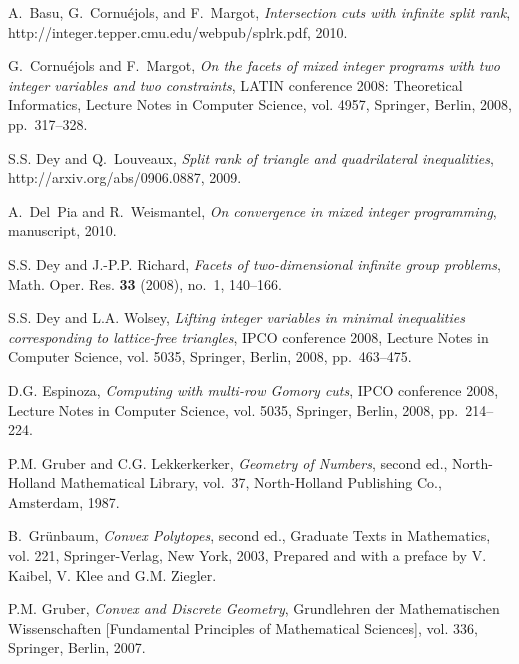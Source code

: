 \documentclass[a4paper]{article}
\theoremstyle{plain}
\begin{document}
\begin{thebibliography}{ALWW07}
A.~Basu, G.~Cornu\'ejols, and F.~Margot, \emph{Intersection cuts with infinite
  split rank}, http://integer.tepper.cmu.edu/webpub/splrk.pdf, 2010.

G.~Cornu{\'e}jols and F.~Margot, \emph{On the facets of mixed integer programs
  with two integer variables and two constraints}, L{ATIN} conference 2008:
  {T}heoretical {I}nformatics, Lecture Notes in Computer Science, vol. 4957,
  Springer, Berlin, 2008, pp.~317--328. 

S.S. Dey and Q.~Louveaux, \emph{Split rank of triangle and quadrilateral
  inequalities}, http://arxiv.org/abs/0906.0887, 2009.

A.~Del~Pia and R.~Weismantel, \emph{On convergence in mixed integer
  programming}, manuscript, 2010.

S.S. Dey and J.-P.P. Richard, \emph{Facets of two-dimensional infinite group
  problems}, Math. Oper. Res. \textbf{33} (2008), no.~1, 140--166.

S.S. Dey and L.A. Wolsey, \emph{Lifting integer variables in minimal
  inequalities corresponding to lattice-free triangles}, IPCO conference 2008,
  Lecture Notes in Computer Science, vol. 5035, Springer, Berlin, 2008,
  pp.~463--475. 

D.G. Espinoza, \emph{Computing with multi-row {G}omory cuts}, IPCO conference
  2008, Lecture Notes in Computer Science, vol. 5035, Springer, Berlin, 2008,
  pp.~214--224. 

P.M. Gruber and C.G. Lekkerkerker, \emph{Geometry of {N}umbers}, second ed.,
  North-Holland Mathematical Library, vol.~37, North-Holland Publishing Co.,
  Amsterdam, 1987. 

B.~Gr{\"u}nbaum, \emph{Convex {P}olytopes}, second ed., Graduate Texts in
  Mathematics, vol. 221, Springer-Verlag, New York, 2003, Prepared and with a
  preface by V. Kaibel, V. Klee and G.M. Ziegler. 

P.M. Gruber, \emph{Convex and {D}iscrete {G}eometry}, Grundlehren der
  Mathematischen Wissenschaften [Fundamental Principles of Mathematical
  Sciences], vol. 336, Springer, Berlin, 2007. 


\end{thebibliography}
\end{document}
